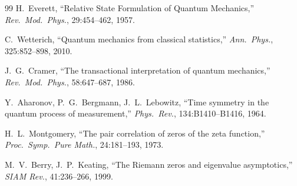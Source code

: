 \documentclass[12pt,a4paper]{article}
\theoremstyle{definition}
\theoremstyle{remark}
\begin{document}
\begin{thebibliography}{99}
 H.~Everett, ``Relative State Formulation of Quantum
  Mechanics,'' \emph{Rev.\ Mod.\ Phys.}, 29:454--462, 1957.


 C.~Wetterich, ``Quantum mechanics from classical
  statistics,'' \emph{Ann.\ Phys.}, 325:852--898, 2010.

 J.~G.~Cramer, ``The transactional interpretation of
  quantum mechanics,'' \emph{Rev.\ Mod.\ Phys.}, 58:647--687, 1986.

 Y.~Aharonov, P.~G.~Bergmann, J.~L.~Lebowitz, ``Time
  symmetry in the quantum process of measurement,'' \emph{Phys.\ Rev.},
  134:B1410--B1416, 1964.

 H.~L.~Montgomery, ``The pair correlation of zeros of
  the zeta function,'' \emph{Proc.\ Symp.\ Pure Math.}, 24:181--193, 1973.

 M.~V.~Berry, J.~P.~Keating, ``The Riemann zeros
  and eigenvalue asymptotics,'' \emph{SIAM Rev.}, 41:236--266, 1999.

\end{thebibliography}
\end{document}
